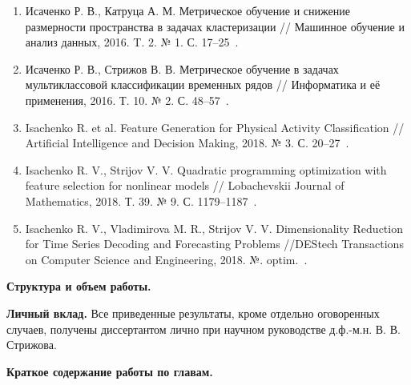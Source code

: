 \begin{enumerate}
	\item Исаченко Р. В., Катруца А. М. Метрическое обучение и снижение размерности пространства в задачах кластеризации // Машинное обучение и анализ данных, 2016. T. 2. № 1. С. 17--25~\cite{isachenko2016metricjmlda}.
	\item Исаченко Р. В., Стрижов В. В. Метрическое обучение в задачах мультиклассовой классификации временных рядов // Информатика и её применения, 2016. Т. 10. № 2. С. 48--57~\cite{isachenko2016metricia}.
	\item Isachenko R. et al. Feature Generation for Physical Activity Classification // Artificial Intelligence and Decision Making, 2018. № 3. С. 20--27~\cite{isachenko2018feature}.
	\item Isachenko R. V., Strijov V. V. Quadratic programming optimization with feature selection for nonlinear models // Lobachevskii Journal of Mathematics, 2018. Т. 39. № 9. С. 1179--1187~\cite{isachenko2018quadratic}.
	\item Isachenko R. V., Vladimirova M. R., Strijov V. V. Dimensionality Reduction for Time Series Decoding and Forecasting Problems //DEStech Transactions on Computer Science and Engineering, 2018. №. optim.~\cite{isachenko2018plsdestech}.
\end{enumerate}

\vspace{0.5cm}
\textbf{Структура и объем работы.}

\vspace{0.5cm}
\textbf{Личный вклад.}
Все приведенные результаты, кроме отдельно оговоренных случаев, получены диссертантом лично при научном руководстве д.ф.-м.н. В. В. Стрижова.

\vspace{0.5cm}
\textbf{Краткое содержание работы по главам.}